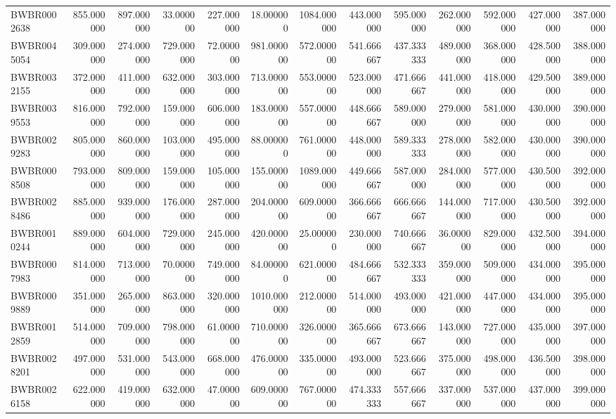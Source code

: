 \begin{longtable}{lrrrrrrrrrrrr}
BWBR0002638 & 855.000000 & 897.000000 & 33.000000 & 227.000000 & 18.000000 & 1084.000000 & 443.000000 & 595.000000 & 262.000000 & 592.000000 & 427.000000 & 387.000000 \\
BWBR0045054 & 309.000000 & 274.000000 & 729.000000 & 72.000000 & 981.000000 & 572.000000 & 541.666667 & 437.333333 & 489.000000 & 368.000000 & 428.500000 & 388.000000 \\
BWBR0032155 & 372.000000 & 411.000000 & 632.000000 & 303.000000 & 713.000000 & 553.000000 & 523.000000 & 471.666667 & 441.000000 & 418.000000 & 429.500000 & 389.000000 \\
BWBR0039553 & 816.000000 & 792.000000 & 159.000000 & 606.000000 & 183.000000 & 557.000000 & 448.666667 & 589.000000 & 279.000000 & 581.000000 & 430.000000 & 390.000000 \\
BWBR0029283 & 805.000000 & 860.000000 & 103.000000 & 495.000000 & 88.000000 & 761.000000 & 448.000000 & 589.333333 & 278.000000 & 582.000000 & 430.000000 & 390.000000 \\
BWBR0008508 & 793.000000 & 809.000000 & 159.000000 & 105.000000 & 155.000000 & 1089.000000 & 449.666667 & 587.000000 & 284.000000 & 577.000000 & 430.500000 & 392.000000 \\
BWBR0028486 & 885.000000 & 939.000000 & 176.000000 & 287.000000 & 204.000000 & 609.000000 & 366.666667 & 666.666667 & 144.000000 & 717.000000 & 430.500000 & 392.000000 \\
BWBR0010244 & 889.000000 & 604.000000 & 729.000000 & 245.000000 & 420.000000 & 25.000000 & 230.000000 & 740.666667 & 36.000000 & 829.000000 & 432.500000 & 394.000000 \\
BWBR0007983 & 814.000000 & 713.000000 & 70.000000 & 749.000000 & 84.000000 & 621.000000 & 484.666667 & 532.333333 & 359.000000 & 509.000000 & 434.000000 & 395.000000 \\
BWBR0009889 & 351.000000 & 265.000000 & 863.000000 & 320.000000 & 1010.000000 & 212.000000 & 514.000000 & 493.000000 & 421.000000 & 447.000000 & 434.000000 & 395.000000 \\
BWBR0012859 & 514.000000 & 709.000000 & 798.000000 & 61.000000 & 710.000000 & 326.000000 & 365.666667 & 673.666667 & 143.000000 & 727.000000 & 435.000000 & 397.000000 \\
BWBR0028201 & 497.000000 & 531.000000 & 543.000000 & 668.000000 & 476.000000 & 335.000000 & 493.000000 & 523.666667 & 375.000000 & 498.000000 & 436.500000 & 398.000000 \\
BWBR0026158 & 622.000000 & 419.000000 & 632.000000 & 47.000000 & 609.000000 & 767.000000 & 474.333333 & 557.666667 & 337.000000 & 537.000000 & 437.000000 & 399.000000 \\

\end{longtable}
